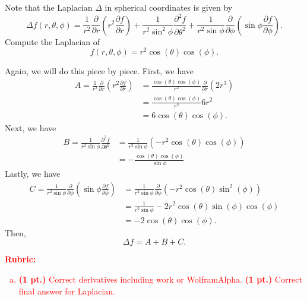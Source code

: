 \documentclass[12pt]{article} %
\begin{document}
\newpage
\begin{problem}
    Note that the Laplacian $\Delta$ in spherical coordinates is given by
    \[
        \Delta f(r,\theta,\phi) = \frac{1}{r^2} \frac{\partial}{\partial r} \left(r^2 \frac{\partial f}{\partial r}\right)+\frac{1}{r^2 \sin^2 \phi} \frac{\partial^2 f}{\partial \theta^2} + \frac{1}{r^2 \sin\phi}\frac{\partial}{\partial \phi} \left(\sin \phi \frac{\partial f}{\partial \phi}\right).
    \]
    Compute the Laplacian of
    \[
       f(r,\theta,\phi) = r^2 \cos(\theta)\cos(\phi).
    \]
\end{problem}
\begin{solution}
 Again, we will do this piece by piece. First, we have
 \begin{align*}
    A=\frac{1}{r^2}\frac{\partial}{\partial r} \left(r^2 \frac{\partial f}{\partial r}\right)&= \frac{\cos (\theta) \cos (\phi)}{r^2}\frac{\partial}{\partial r} \left(2r^3\right) \\
    &= \frac{\cos (\theta) \cos(\phi)}{r^2} 6r^2\\
    &= 6 \cos (\theta) \cos (\phi).
 \end{align*}
 Next, we have
 \begin{align*}
    B=\frac{1}{r^2 \sin \phi} \frac{\partial^2 f}{\partial \theta^2} &= \frac{1}{r^2 \sin \phi} (-r^2\cos(\theta)\cos(\phi))\\
    &= -\frac{\cos(\theta)\cos(\phi)}{\sin\phi}
 \end{align*}
 Lastly, we have
 \begin{align*}
    C=\frac{1}{r^2\sin \phi} \frac{\partial }{\partial \phi} \left(\sin \phi \frac{\partial f}{\partial \phi}\right)&= \frac{1}{r^2\sin \phi} \frac{\partial }{\partial \phi} \left( -r^2 \cos(\theta) \sin^2(\phi)\right)\\
&=\frac{1}{r^2 \sin \phi} -2r^2 \cos(\theta)\sin(\phi)\cos(\phi)\\
&=-2\cos(\theta)\cos(\phi).
 \end{align*}
 Then,
 \[
 \Delta f = A+B+C.
 \]
\end{solution}
\vspace*{1cm}
\textcolor{red}{
\noindent \textbf{Rubric:}
\begin{enumerate}[(a)]
    \item \textbf{(1 pt.)} Correct derivatives including work or WolframAlpha. \textbf{(1 pt.)} Correct final answer for Laplacian.
\end{enumerate}
}
\end{document}
